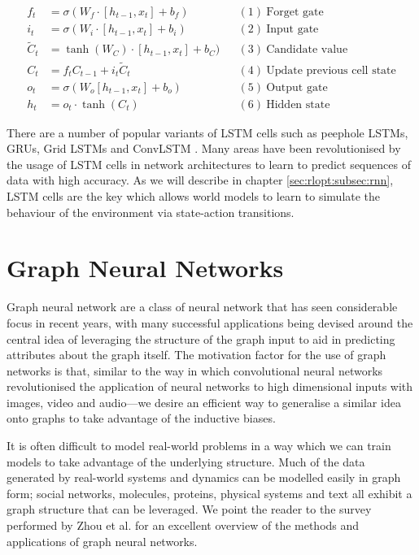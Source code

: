 \begin{center}
  \begin{align*}
    f_t &= \sigma (W_f \cdot [h_{t-1}, x_t] + b_f) && (1)~\text{Forget gate} \\
    i_t &= \sigma (W_i \cdot [h_{t-1}, x_t] + b_i) && (2)~\text{Input gate} \\
    \tilde{C}_t &= \tanh (W_C) \cdot [h_{t-1}, x_t] + b_C) && (3)~\text{Candidate value} \\
    C_t &= f_t C_{t-1} + i_t \tilde{C}_t && (4)~\text{Update previous cell state} \\
    o_t &= \sigma (W_o [h_{t-1}, x_t] + b_o) && (5)~\text{Output gate} \\
    h_t &= o_t \cdot \tanh (C_t) && (6)~\text{Hidden state}
  \end{align*}
\end{center}

There are a number of popular variants of LSTM cells such as peephole LSTMs, GRUs, Grid LSTMs and ConvLSTM \cite{yu2019review}. Many areas have been revolutionised by the usage of LSTM cells in network architectures to learn to predict sequences of data with high accuracy. As we will describe in chapter \ref{sec:rlopt:subsec:rnn}, LSTM cells are the key which allows world models to learn to simulate the behaviour of the environment via state-action transitions.

\section{Graph Neural Networks}

Graph neural network are a class of neural network that has seen considerable focus in recent years, with many successful applications being devised around the central idea of leveraging the structure of the graph input to aid in predicting attributes about the graph itself. The motivation factor for the use of graph networks is that, similar to the way in which convolutional neural networks revolutionised the application of neural networks to high dimensional inputs with images, video and audio---we desire an efficient way to generalise a similar idea onto graphs to take advantage of the inductive biases.

It is often difficult to model real-world problems in a way which we can train models to take advantage of the underlying structure. Much of the data generated by real-world systems and dynamics can be modelled easily in graph form; social networks, molecules, proteins, physical systems and text all exhibit a graph structure that can be leveraged. We point the reader to the survey performed by Zhou et al. \cite{zhou2020graph} for an excellent overview of the methods and applications of graph neural networks.

